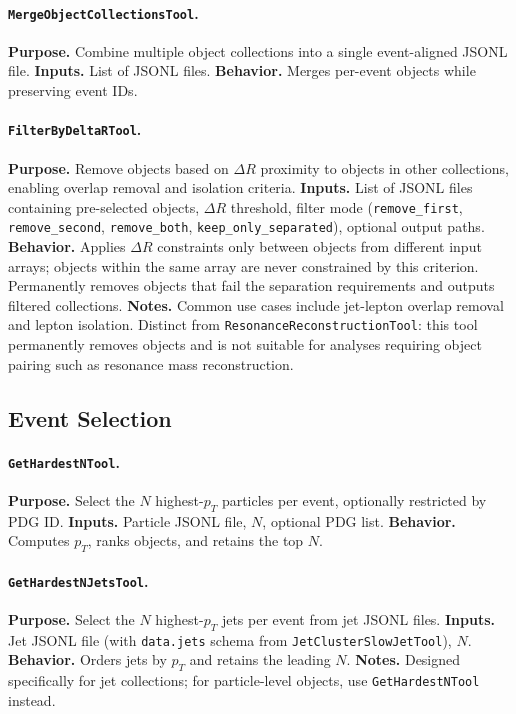 \documentclass[11pt,oneside]{article}
\numberwithin{equation}{section}
\begin{document}
\begin{appendix}
\paragraph{\texttt{MergeObjectCollectionsTool}.}
\textbf{Purpose.} Combine multiple object collections into a single event-aligned JSONL file.  
\textbf{Inputs.} List of JSONL files.  
\textbf{Behavior.} Merges per-event objects while preserving event IDs.  

\paragraph{\texttt{FilterByDeltaRTool}.}
\textbf{Purpose.} Remove objects based on $\Delta R$ proximity to objects in other collections, enabling overlap removal and isolation criteria.
\textbf{Inputs.} List of JSONL files containing pre-selected objects, $\Delta R$ threshold, filter mode (\texttt{remove\_first}, \texttt{remove\_second}, \texttt{remove\_both}, \texttt{keep\_only\_separated}), optional output paths.
\textbf{Behavior.} Applies $\Delta R$ constraints only between objects from different input arrays; objects within the same array are never constrained by this criterion. Permanently removes objects that fail the separation requirements and outputs filtered collections.
\textbf{Notes.} Common use cases include jet-lepton overlap removal and lepton isolation. Distinct from \texttt{ResonanceReconstructionTool}: this tool permanently removes objects and is not suitable for analyses requiring object pairing such as resonance mass reconstruction.  


\subsection{Event Selection}

\paragraph{\texttt{GetHardestNTool}.}
\textbf{Purpose.} Select the $N$ highest-$p_T$ particles per event, optionally restricted by PDG ID.  
\textbf{Inputs.} Particle JSONL file, $N$, optional PDG list.  
\textbf{Behavior.} Computes $p_T$, ranks objects, and retains the top $N$.  

\paragraph{\texttt{GetHardestNJetsTool}.}
\textbf{Purpose.} Select the $N$ highest-$p_T$ jets per event from jet JSONL files.
\textbf{Inputs.} Jet JSONL file (with \texttt{data.jets} schema from \texttt{JetClusterSlowJetTool}), $N$.
\textbf{Behavior.} Orders jets by $p_T$ and retains the leading $N$.
\textbf{Notes.} Designed specifically for jet collections; for particle-level objects, use \texttt{GetHardestNTool} instead.  


\end{appendix}
\end{document}
